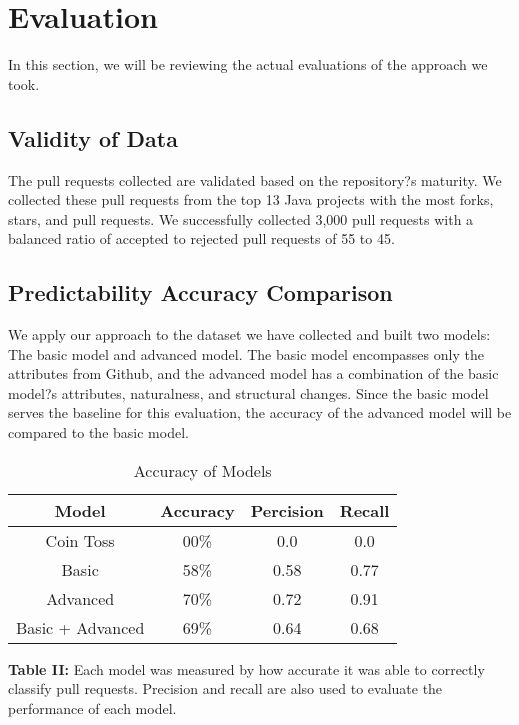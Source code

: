 \documentclass[10pt, conference]{IEEEtran}
\begin{document}
\section{Evaluation}
In this section, we will be reviewing the actual evaluations of the approach we took.

\subsection{Validity of Data}
The pull requests collected are validated based on the repository?s maturity. We collected these pull requests from the top 13 Java projects with the most forks, stars, and pull requests. We successfully collected 3,000 pull requests with a balanced ratio of accepted to rejected pull requests of 55 to 45.

\subsection{Predictability Accuracy Comparison}
We apply our approach to the dataset we have collected and built two models: The basic model and advanced model. The basic model encompasses only the attributes from Github, and the advanced model has a combination of the basic model?s attributes, naturalness, and structural changes. Since the basic model serves the baseline for this evaluation, the accuracy of the advanced model will be compared to the basic model. 

\begin{table}[h!]
  \centering
  \caption{Accuracy of Models}
  \label{tab:Figure II}
  \begin{tabular}{|c|c|c|c|}
    \hline
    \textbf {Model} & \textbf{Accuracy} & \textbf{Percision} & \textbf{Recall}\\ %
    \hline
    Coin Toss & 00\% & 0.0 & 0.0\\ %
    \hline
    Basic & 58\% & 0.58 & 0.77\\ %
    \hline
    Advanced & 70\% & 0.72 & 0.91\\ %
    \hline
    Basic + Advanced & 69\% & 0.64 & 0.68\\ %
    \hline
  \end{tabular}
  \break
  \break
\textbf{Table II:} Each model was measured by how accurate it was able to correctly classify pull requests. Precision and recall are also used to evaluate the performance of each model.
\end{table}
\end{document}
